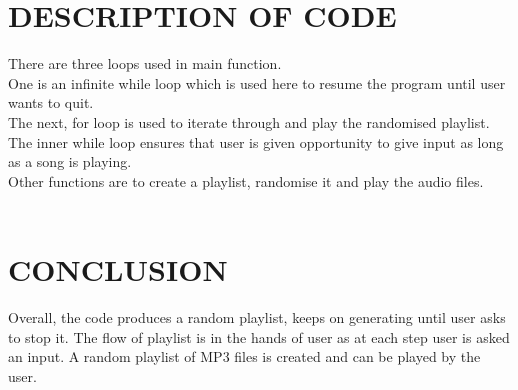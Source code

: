 \documentclass[journal,12pt,twocolumn]{IEEEtran}
\begin{document}
\section{DESCRIPTION OF CODE } There are three loops used in main function.\\
One is an infinite while loop which is used here to resume the program until user wants to quit.\\
The next, for loop is used to iterate through and play the randomised playlist.\\
The inner while loop ensures that user is given opportunity to give input as long as a song is playing.\\
Other functions are to create a playlist, randomise it and play the audio files.
\\
\\
\section{CONCLUSION } Overall, the code produces a random playlist, keeps on generating until user asks to stop it. The flow of playlist is in the hands of user as at each step user is asked an input. A random playlist of MP3 files is created
and can be played by the user.
\end{document}
